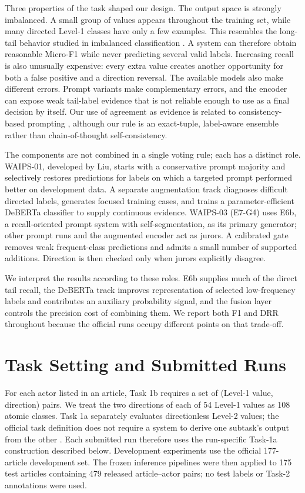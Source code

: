 \documentclass[sigconf,article,a4paper]{acmart}
\begin{document}
Three properties of the task shaped our design. The output space is
strongly imbalanced. A small group of values appears throughout the training
set, while many directed Level-1 classes have only a few examples. This resembles
the long-tail behavior studied in imbalanced classification \cite{cui2019,menon2021}. A system can
therefore obtain reasonable Micro-F1 while never predicting several valid
labels. Increasing recall is also unusually expensive: every extra value
creates another opportunity for both a false positive and a direction
reversal. The available models also make different errors. Prompt variants
make complementary errors, and the encoder can expose weak tail-label evidence
that is not reliable enough to use as a final decision by itself. Our use of
agreement as evidence is related to consistency-based prompting
\cite{wangSelfConsistency2023}, although our rule is an exact-tuple,
label-aware ensemble rather than chain-of-thought self-consistency.

The components are not combined in a single voting rule; each has a distinct
role. WAIPS-01, developed by Liu, starts with a conservative
prompt majority and selectively restores predictions for labels on which a
targeted prompt performed better on development data. A separate augmentation track
diagnoses difficult directed labels, generates focused training cases, and
trains a parameter-efficient DeBERTa classifier to supply continuous evidence.
WAIPS-03 (E7-G4) uses E6b, a recall-oriented prompt system with
self-segmentation, as its primary generator; other prompt runs and the
augmented encoder act as jurors.
A calibrated gate removes weak frequent-class predictions and admits a small
number of supported additions. Direction is then checked only when jurors
explicitly disagree.

We interpret the results according to these roles. E6b supplies much
of the direct tail recall, the DeBERTa track improves representation of
selected low-frequency labels and contributes an auxiliary probability signal,
and the fusion layer controls the precision cost of combining them. We report
both F1 and DRR throughout because the official runs occupy different
points on that trade-off.

\section{Task Setting and Submitted Runs}

For each actor listed in an article, Task 1b requires a set of (Level-1 value,
direction) pairs. We treat the two directions of each of 54 Level-1 values as
108 atomic classes. Task 1a separately evaluates directionless Level-2 values;
the official task definition does not require a system to derive one subtask's
output from the other \cite{wangFehu2026}. Each submitted run therefore uses the
run-specific Task-1a construction described below. Development experiments use
the official 177-article development set. The frozen inference pipelines were
then applied to 175 test articles containing 479 released article--actor pairs;
no test labels or Task-2 annotations were used.
\end{document}
